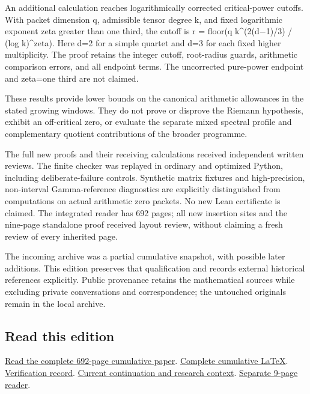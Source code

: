 \documentclass[
]{article}
\begin{document}
An additional calculation reaches logarithmically corrected
critical-power cutoffs. With packet dimension q, admissible tensor
degree k, and fixed logarithmic exponent zeta greater than one third,
the cutoff is r = floor(q k\^{}(2(d−1)/3) / (log k)\^{}zeta). Here d=2
for a simple quartet and d=3 for each fixed higher multiplicity. The
proof retains the integer cutoff, root-radius guards, arithmetic
comparison errors, and all endpoint terms. The uncorrected pure-power
endpoint and zeta=one third are not claimed.

These results provide lower bounds on the canonical arithmetic
allowances in the stated growing windows. They do not prove or disprove
the Riemann hypothesis, exhibit an off-critical zero, or evaluate the
separate mixed spectral profile and complementary quotient contributions
of the broader programme.

The full new proofs and their receiving calculations received
independent written reviews. The finite checker was replayed in ordinary
and optimized Python, including deliberate-failure controls. Synthetic
matrix fixtures and high-precision, non-interval Gamma-reference
diagnostics are explicitly distinguished from computations on actual
arithmetic zero packets. No new Lean certificate is claimed. The
integrated reader has 692 pages; all new insertion sites and the
nine-page standalone proof received layout review, without claiming a
fresh review of every inherited page.

The incoming archive was a partial cumulative snapshot, with possible
later additions. This edition preserves that qualification and records
external historical references explicitly. Public provenance retains the
mathematical sources while excluding private conversations and
correspondence; the untouched originals remain in the local archive.

\subsection{Read this edition}\label{read-this-edition-4}

\href{https://github.com/KokunoYumeto/zeta-function-research-reader/blob/main/workbenches/splitzero-tandem/continuations/20260917-root-sensitive-growing-degree/15_CURRENT_MIXED_CONTROL_READER.pdf}{Read
the complete 692-page cumulative paper}.
\href{https://github.com/KokunoYumeto/zeta-function-research-reader/blob/main/workbenches/splitzero-tandem/continuations/20260917-root-sensitive-growing-degree/14_CURRENT_KERNEL_AND_MULTIPLICITY_PROOFS.tex}{Complete
cumulative LaTeX}.
\href{https://github.com/KokunoYumeto/zeta-function-research-reader/blob/main/workbenches/splitzero-tandem/continuations/20260917-root-sensitive-growing-degree/12_VALIDATION.md}{Verification
record}.
\href{https://github.com/KokunoYumeto/zeta-function-research-reader/blob/main/workbenches/splitzero-tandem/continuations/20260917-root-sensitive-growing-degree/00_CONTINUE_HERE.md}{Current
continuation and research context}.
\href{https://github.com/KokunoYumeto/zeta-function-research-reader/blob/main/workbenches/splitzero-tandem/continuations/20260917-root-sensitive-growing-degree/ROOT_SENSITIVE_GROWING_DEGREE_CORRECTED.pdf}{Separate
9-page reader}.
\end{document}
